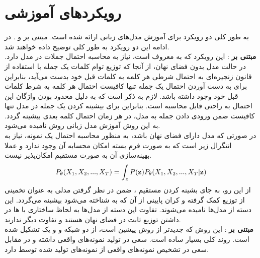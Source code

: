 \section{رویکردهای آموزشی}
به طور کلی دو رویکرد برای آموزش مدل‌های زبانی ارائه شده است. مبتنی بر \likelihood{} و 
.
در ادامه این دو رویکرد به طور کلی توضیح داده خواهند شد.
\\
{\bf مبتنی بر \likelihood{}}:
این رویکرد که به 
معروف است، نیاز به محاسبه احتمال جملات در مدل دارد. در حالت مدل بدون فضای نهان، از آنجا که توزیع توام کلمات یک جمله با استفاده از قانون زنجیره‌ای به احتمال شرطی هر کلمه به کلمات قبل خود بدست می‌آید، بنابراین برای به دست آوردن احتمال یک جمله تنها کافیست احتمال هر کلمه به شرط کلمات قبل خود وجود داشته باشد. لازم به ذکر است که به دلیل محدود بودن واژگان این احتمال به راحتی قابل محاسبه است. بنابراین برای بیشینه کردن \likelihood{} یک جمله در مدل تنها کافیست ضمن ورودی دادن جمله به مدل، در هر زمان احتمال کلمه بعدی بیشینه گردد. به این روش آموزش مدل زبانی روش 
نامیده می‌شود.
\\
در صورتی که مدل دارای فضای نهان باشد، به منظور محاسبه احتمال یک نمونه، نیاز به انتگرال زیر است که به صورت فرم بسته امکان محسابه آن وجود ندارد و عملا بهینه‌سازی آن به صورت مستقیم امکان‌پذیر نیست.
\begin{align}
P_\theta(X_1, X_2, ... , X_T) = \int_z P({\bf z})P_\theta(X_1, X_2, ... , X_T|{\bf z})
\end{align}
 از این رو، به جای بشینه کردن مستقیم \likelihood{}، ضمن در نظر گرفتن مدلی به عنوان تخمینی از توزیع
 کمک گرفته و کران پایینی از آن که به  شناخته می‌شود بیشینه می‌گردد. این دسته از مدل‌ها 
نامیده می‌شوند. تفاوت این دسته از مدل‌ها به لحاظ ساختاری با 
ها
در داشتن توزیع ثابت در فضای نهان هستند و تفاوت دیگر ندارند.
\\
{\bf مبتنی بر \gan{}}: 
این روش که جدید‌تر از روش پیشین است، از دو شبکه \generator{} و 
 و یک \minmaxgame{} تشکیل شده است. روند کلی بسیار ساده است. \generator{} سعی در تولید نمونه‌های واقعی داشته و در مقابل \discriminator{} سعی در تشخیص نمونه‌های واقعی از نمونه‌های تولید شده توسط \generator{} دارد. 
 \\
